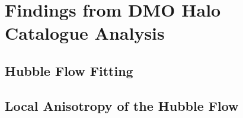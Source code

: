 \documentclass[english, oneside]{HYgradu}
\begin{document}
\chapter{Findings from DMO Halo Catalogue Analysis}

\section{Hubble Flow Fitting}

\section{Local Anisotropy of the Hubble Flow}



%
%
\end{document}
